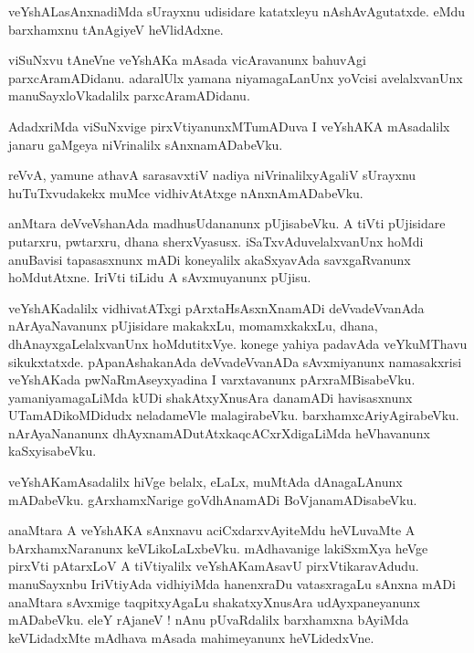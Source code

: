 \documentclass{article}
\begin{document}
\begin{mn}%
veYshALasAnxnadiMda sUrayxnu udisidare katatxleyu nAshAvAgutatxde. eMdu barxhamxnu 
tAnAgiyeV heVlidAdxne.
\end{mn}

\begin{mn}%
viSuNxvu tAneVne veYshAKa mAsada vicAravanunx bahuvAgi parxcAramADidanu. adaralUlx yamana 
niyamagaLanUnx yoVcisi avelalxvanUnx manuSayxloVkadalilx parxcAramADidanu.
\end{mn}

\begin{mn}%
AdadxriMda viSuNxvige pirxVtiyanunxMTumADuva I veYshAKA mAsadalilx janaru gaMgeya 
niVrinalilx sAnxnamADabeVku.
\end{mn}

\begin{mn}%
reVvA, yamune athavA sarasavxtiV nadiya niVrinalilxyAgaliV sUrayxnu huTuTxvudakekx muMce 
vidhivAtAtxge nAnxnAmADabeVku.
\end{mn}

\begin{mn}%
anMtara deVveVshanAda madhusUdananunx pUjisabeVku. A tiVti pUjisidare putarxru, pwtarxru, 
dhana sherxVyasusx. iSaTxvAduvelalxvanUnx hoMdi anuBavisi tapasasxnunx mADi koneyalilx 
akaSxyavAda savxgaRvanunx hoMdutAtxne. IriVti tiLidu A sAvxmuyanunx pUjisu.
\end{mn}

\begin{mn}%
veYshAKadalilx vidhivatATxgi pArxtaHsAsxnXnamADi deVvadeVvanAda nArAyaNavanunx pUjisidare 
makakxLu, momamxkakxLu, dhana, dhAnayxgaLelalxvanUnx hoMdutitxVye. konege yahiya padavAda 
veYkuMThavu sikukxtatxde. pApanAshakanAda deVvadeVvanADa sAvxmiyanunx namasakxrisi 
veYshAKada pwNaRmAseyxyadina I varxtavanunx pArxraMBisabeVku. yamaniyamagaLiMda kUDi 
shakAtxyXnusAra danamADi havisasxnunx UTamADikoMDidudx neladameVle malagirabeVku.
barxhamxcAriyAgirabeVku. nArAyaNananunx dhAyxnamADutAtxkaqcACxrXdigaLiMda heVhavanunx 
kaSxyisabeVku.
\end{mn}

\begin{mn}%
veYshAKamAsadalilx hiVge belalx, eLaLx, muMtAda dAnagaLAnunx mADabeVku. gArxhamxNarige 
goVdhAnamADi BoVjanamADisabeVku.
\end{mn}

\begin{mn}%
anaMtara A veYshAKA sAnxnavu aciCxdarxvAyiteMdu heVLuvaMte A bArxhamxNaranunx 
keVLikoLaLxbeVku. mAdhavanige lakiSxmXya heVge pirxVti pAtarxLoV A tiVtiyalilx 
veYshAKamAsavU pirxVtikaravAdudu. manuSayxnbu IriVtiyAda vidhiyiMda hanenxraDu 
vatasxragaLu sAnxna mADi anaMtara sAvxmige taqpitxyAgaLu shakatxyXnusAra udAyxpaneyanunx 
mADabeVku. eleY rAjaneV ! nAnu pUvaRdalilx barxhamxna bAyiMda keVLidadxMte mAdhava mAsada 
mahimeyanunx heVLidedxVne.
\end{mn}
\end{document}
